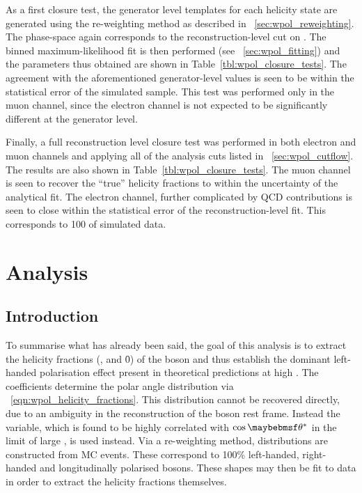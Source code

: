 As a first closure test, the generator level \LP templates for each helicity
state are generated using the re-weighting method as described in
\sec~\ref{sec:wpol_reweighting}. The phase-space again corresponds to the
reconstruction-level cut on \PtW. The binned maximum-likelihood fit is then
performed (see \sec~\ref{sec:wpol_fitting}) and the parameters thus obtained are
shown in Table~\ref{tbl:wpol_closure_tests}. The agreement with the
aforementioned generator-level values is seen to be within the statistical error
of the simulated sample. This test was performed only in the muon channel, since
the electron channel is not expected to be significantly different at the
generator level.

Finally, a full reconstruction level closure test was performed in both electron
and muon channels and applying all of the analysis cuts listed in
\sec~\ref{sec:wpol_cutflow}. The results are also shown in
Table~\ref{tbl:wpol_closure_tests}. The muon channel is seen to recover the
``true'' helicity fractions to within the uncertainty of the analytical fit. The
electron channel, further complicated by \ac{QCD} contributions is seen to close
within the statistical error of the reconstruction-level fit. This corresponds
to \unit{100}{\invpicobarn} of simulated data.



\section{Analysis}
\subsection{Introduction}
To summarise what has already been said, the goal of this analysis is to extract
the helicity fractions (\fL, \fR and \f0) of the \PW boson and thus establish
the dominant left-handed polarisation effect present in theoretical predictions
at high \PtW. The \ffi coefficients determine the polar angle distribution via
\eqn~\ref{eqn:wpol_helicity_fractions}. This distribution cannot be recovered
directly, due to an ambiguity in the reconstruction of the \PW boson rest
frame. Instead the \LP variable, which is found to be highly correlated with
$\cos\thetastar$ in the limit of large \PtW, is used instead. Via a re-weighting
method, \LP distributions are constructed from \ac{MC} events. These correspond
to 100\% left-handed, right-handed and longitudinally polarised \PW
bosons. These shapes may then be fit to data in order to extract the helicity
fractions themselves.

